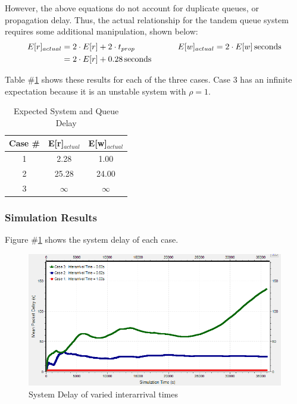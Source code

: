 \documentclass{article}
\begin{document}
However, the above equations do not account for duplicate queues, or propagation delay.
Thus, the actual relationship for the tandem queue system requires some additional manipulation, shown below:
\begin{align*}
 E[r]_{actual} &= 2 \cdot E[r] + 2 \cdot t_{prop} \hspace{.15\textwidth} E[w]_{actual} = 2 \cdot E[w] \, \text{seconds}	\\
			   &=2 \cdot E[r] + 0.28 \, \text{seconds}  \\
\end{align*}

Table \#\ref{tab:expectDelay} shows these results for each of the three cases.
Case 3 has an infinite expectation because it is an unstable system with $\rho = 1$.
\begin{table}[h!]
\centering
\begin{tabular}{|c|c|c|} \hline
\textbf{Case \#} & \textbf{E[r]$_{actual}$} & \textbf{E[w]$_{actual}$} \\ \hline
1 & 2.28 & 1.00  \\ \hline
2 & 25.28 & 24.00 \\ \hline
3 & $\infty$ & $\infty$ \\ \hline 
\end{tabular}
\caption{Expected System and Queue Delay}
\label{tab:expectDelay}
\end{table}

\newpage
\subsubsection*{Simulation Results}
Figure \#\ref{DelayPlot} shows the system delay of each case.

\begin{figure}[h!]
	\begin{center}
	\includegraphics[scale=0.85]{Images/DelayPlot.PNG}
	\vspace{-.25cm}
	\caption{System Delay of varied interarrival times}
	\label{DelayPlot}
	\end{center}
\end{figure}
\end{document}
